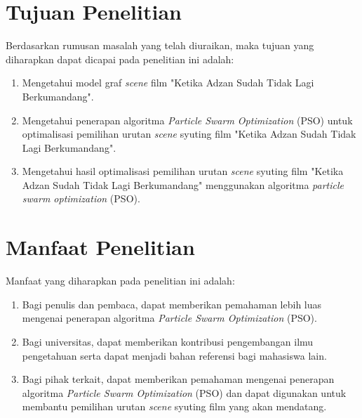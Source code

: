 \section{Tujuan Penelitian}
\vspace{-4mm}
{\frenchspacing
    Berdasarkan rumusan masalah yang telah diuraikan, maka tujuan yang diharapkan dapat dicapai pada penelitian ini adalah:

    \begin{enumerate}[left = 0em, align = left, nolistsep]
        \item Mengetahui model graf \textit{scene} film "Ketika Adzan Sudah Tidak Lagi Berkumandang".
        \item Mengetahui penerapan algoritma \textit{Particle Swarm Optimization} (PSO) untuk optimalisasi pemilihan urutan \textit{scene} syuting film "Ketika Adzan Sudah Tidak Lagi Berkumandang".
        \item Mengetahui hasil optimalisasi pemilihan urutan \textit{scene} syuting film "Ketika Adzan Sudah Tidak Lagi Berkumandang" menggunakan algoritma \textit{particle swarm optimization} (PSO).
    \end{enumerate}
}
\vspace{-3mm}

\section{Manfaat Penelitian}
\vspace{-4mm}
{\frenchspacing
    Manfaat yang diharapkan pada penelitian ini adalah:

    \begin{enumerate}[left = 0em, align = left, nolistsep]
        \item Bagi penulis dan pembaca, dapat memberikan pemahaman lebih luas mengenai penerapan algoritma \textit{Particle Swarm Optimization} (PSO).
        \item Bagi universitas, dapat memberikan kontribusi pengembangan ilmu pengetahuan serta dapat menjadi bahan referensi bagi mahasiswa lain.
        \item Bagi pihak terkait, dapat memberikan pemahaman mengenai penerapan algoritma \textit{Particle Swarm Optimization} (PSO) dan dapat digunakan untuk membantu pemilihan urutan \textit{scene} syuting film yang akan mendatang.
    \end{enumerate}
}
\vspace{-3mm}

\pagebreak